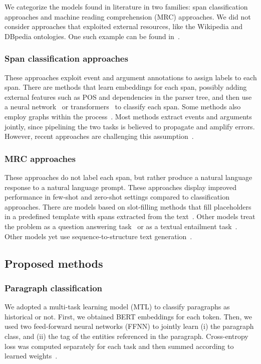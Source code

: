 \documentclass[runningheads]{llncs}
\begin{document}
We categorize the models found in literature in two families: span classification approaches and machine reading comprehension (MRC) approaches. We did not consider approaches that exploited external resources, like the Wikipedia and DBpedia ontologies. One such example can be found in~\cite{ahonen-hyvonen-2009-historical}. 

\subsubsection{Span classification approaches} These approaches exploit event and argument annotations to assign labels to each span. There are methods that learn embeddings for each span, possibly adding external features such as POS and dependencies in the parser tree, and then use a neural network~\cite{ebner-etal-2020-rams,zhong-chen-2021-frustratingly,nguyen-nguyen-2019-one-for-all} or transformers~\cite{chen-etal-2020-joint-modeling} to classify each span. Some methods also employ graphs within the process~\cite{lin-etal-2020-oneie,wadden-etal-2019-entity,luan-etal-2019-general,nguyen-2021-gcn}. Most methods extract events and arguments jointly, since pipelining the two tasks is believed to propagate and amplify errors. However, recent approaches are challenging this assumption~\cite{zhong-chen-2021-frustratingly}. 

\subsubsection{MRC approaches} These approaches do not label each span, but rather produce a natural language response to a natural language prompt. These approaches display improved performance in few-shot and zero-shot settings compared to classification approaches. There are models based on slot-filling methods that fill placeholders in a predefined template with spans extracted from the text~\cite{chen-etal-2020-manual,li-etal-2021-genarg}. Other models treat the problem as a question answering task~\cite{du-cardie-2020-event,feng-etal-2020-probing,liu-etal-2020-mrc} or as a textual entailment task~\cite{feng-etal-2020-probing}. Other models yet use sequence-to-structure text generation~\cite{lu-etal-2021-text2event}.

\subsection{Proposed methods}

\subsubsection{Paragraph classification} We adopted a multi-task learning model (MTL) to classify paragraphs as historical or not. First, we obtained BERT embeddings for each token. Then, we used two feed-forward neural networks (FFNN) to jointly learn (i) the paragraph class, and (ii) the tag of the entities referenced in the paragraph. Cross-entropy loss was computed separately for each task and then summed according to learned weights~\cite{kendall-etal-2017-mtl-loss}.
\end{document}
